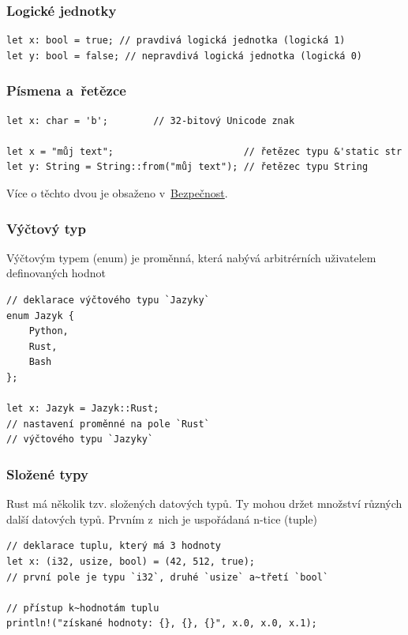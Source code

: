 \documentclass[a4paper, 12pt, twoside]{article} %
\begin{document}
		\subsubsection*{Logické jednotky}
			\begin{verbatim}
let x: bool = true; // pravdivá logická jednotka (logická 1)
let y: bool = false; // nepravdivá logická jednotka (logická 0)
			\end{verbatim}


		\subsubsection*{Písmena a~řetězce}
			\begin{verbatim}
let x: char = 'b';        // 32-bitový Unicode znak

let x = "můj text";                       // řetězec typu &'static str
let y: String = String::from("můj text"); // řetězec typu String
		\end{verbatim}
			Více o těchto dvou je obsaženo v~\hyperlink{vlast}{Bezpečnost}.


		\subsubsection*{Výčtový typ}
			Výčtovým typem (enum) je proměnná, která nabývá arbitrérních uživatelem definovaných hodnot
			\begin{verbatim}
// deklarace výčtového typu `Jazyky`
enum Jazyk {
	Python,
	Rust,
	Bash
};

let x: Jazyk = Jazyk::Rust;
// nastavení proměnné na pole `Rust`
// výčtového typu `Jazyky`
			\end{verbatim}


		\subsubsection*{Složené typy}
			Rust má několik tzv. složených datových typů. Ty mohou držet množství různých další datových typů. Prvním z~nich je uspořádaná n-tice (tuple)

			\begin{verbatim}
// deklarace tuplu, který má 3 hodnoty
let x: (i32, usize, bool) = (42, 512, true);
// první pole je typu `i32`, druhé `usize` a~třetí `bool`

// přístup k~hodnotám tuplu
println!("získané hodnoty: {}, {}, {}", x.0, x.0, x.1);
			\end{verbatim}
		
\end{document}
